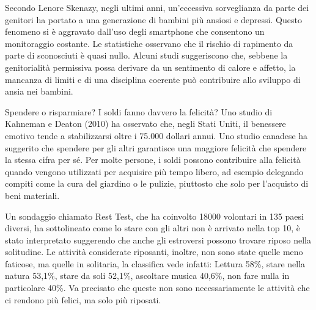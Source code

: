 \documentclass[12pt]{book} %
\begin{document}
\begin{mdframed}[linewidth=1pt]
Secondo Lenore Skenazy, negli ultimi anni, un'eccessiva sorveglianza da parte dei genitori ha portato a una generazione di bambini più ansiosi e depressi. Questo fenomeno si è aggravato dall'uso degli smartphone che consentono un monitoraggio costante. Le statistiche osservano che il rischio di rapimento da parte di sconosciuti è quasi nullo.
Alcuni studi   suggeriscono che, sebbene la genitorialità permissiva possa derivare da un sentimento di calore e affetto, la mancanza di limiti e di una disciplina coerente può contribuire allo sviluppo di ansia nei bambini.

Spendere o risparmiare? I soldi fanno davvero la felicità? Uno studio di Kahneman e Deaton (2010) ha osservato che, negli Stati Uniti, il benessere emotivo tende a stabilizzarsi oltre i 75.000 dollari annui. Uno studio canadese ha suggerito che spendere per gli altri garantisce una maggiore felicità che spendere la stessa cifra per sé. 
Per molte persone, i soldi possono contribuire alla felicità quando vengono utilizzati per acquisire più tempo libero, ad esempio delegando compiti come la cura del giardino o le pulizie, piuttosto che solo per l'acquisto di beni materiali. 

Un sondaggio chiamato Rest Test, che ha coinvolto 18000 volontari in 135 paesi diversi, ha sottolineato come lo stare con gli altri non è arrivato nella top 10, è stato interpretato suggerendo che anche gli estroversi possono trovare riposo nella solitudine. Le attività considerate riposanti, inoltre, non sono state quelle meno faticose, ma quelle in solitaria, la classifica vede infatti: Lettura 58\%, stare nella natura 53,1\%, stare da soli 52,1\%, ascoltare musica 40,6\%, non fare nulla in particolare 40\%. Va precisato che queste non sono necessariamente le attività che ci rendono più felici, ma solo più riposati.


\end{mdframed}
\end{document}
